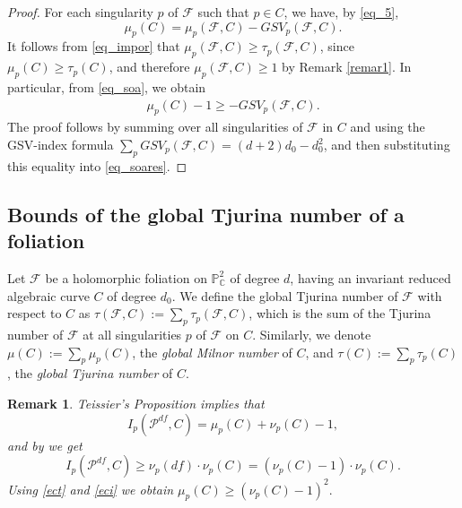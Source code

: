 \documentclass[11pt]{amsart}
\newcommand{\C}{\mathbb{C}}
\newcommand{\F}{\mathcal{F}}
\newtheorem{remark}[theorem]{Remark}
\begin{document}
\begin{proof}
For each singularity $p$ of $\F$ such that $p\in C$, we have, by \eqref{eq_5},
\begin{equation}\label{eq_soa}
    \mu_p(C)=\mu_p(\F,C)-GSV_p(\F,C).
\end{equation} 
It follows from \eqref{eq_impor} that $\mu_p(\F,C)\geq\tau_p(\F,C)$, since $\mu_p(C)\geq\tau_p(C)$, and therefore $\mu_p(\F,C)\geq 1$ by Remark \ref{remar1}. In particular, from \eqref{eq_soa}, we obtain
\begin{eqnarray}\label{eq_soares}
    \mu_p(C)-1\geq -GSV_p(\F,C).
\end{eqnarray}
The proof follows by summing over all singularities of $\F$ in $C$ and using the GSV-index formula \cite[Proposition 2.3]{Brunella-book}
$\sum_p GSV_p(\F,C)=(d+2)d_0-d_0^2$,
and then substituting this equality into \eqref{eq_soares}.
\end{proof}
\subsection{Bounds of the global Tjurina number of a foliation}
Let $\F$ be a holomorphic foliation on $\mathbb{P}^2_\C$ of degree $d$, having an invariant reduced algebraic curve $C$ of degree $d_0$. We define the global Tjurina number of $\F$ with respect to $C$ as $\tau(\F,C):=\sum_p \tau_p(\F,C)$, which is the sum of the Tjurina number of $\F$ at all singularities $p$ of $\F$ on $C$. Similarly, we denote $\mu(C):=\sum_{p}\mu_p(C)$, the \textit{global Milnor number} of $C$, and $\tau(C):=\sum_p \tau_p(C)$, the \textit{global Tjurina number} of $C$. 


\begin{remark}\label{cotamuuu}
Teissier's Proposition \cite[Chapter II, Proposition 1.2]{Teissier} implies that
\begin{equation}\label{ect}
    I_p(\mathcal{P}^{df},C)=\mu_p(C)+\nu_p(C)-1,
\end{equation}
 and by \cite[Theorem 4.18]{H} we get 
 \begin{equation}\label{eci}
  I_p(\mathcal{P}^{df},C) \geq  \nu_p(df)\cdot\nu_p(C)=(\nu_p(C)-1)\cdot\nu_p(C).   
 \end{equation} Using \eqref{ect} and \eqref{eci} we obtain $\mu_p(C)\geq (\nu_p(C)-1)^{2}.$     
\end{remark}
\end{document}
